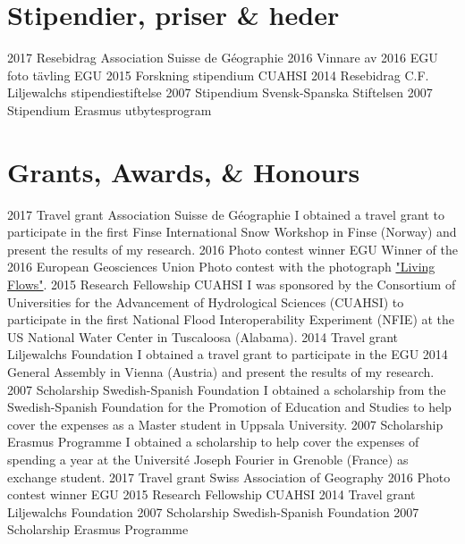 \ifswedish
    \section{Stipendier, priser \& heder}
    \shortposition
        {2017}
        {Resebidrag}
        {Association Suisse de Géographie}
    \shortposition
        {2016}
        {Vinnare av 2016 EGU foto tävling}
        {EGU}
    \shortposition
        {2015}
        {Forskning stipendium}
        {CUAHSI}
    \shortposition
        {2014}
        {Resebidrag}
        {C.F. Liljewalchs stipendiestiftelse}
    \shortposition
        {2007}
        {Stipendium}
        {Svensk-Spanska Stiftelsen}
    \shortposition
        {2007}
        {Stipendium}
        {Erasmus utbytesprogram}
\else
    \section{Grants, Awards, \& Honours}
    \ifacademic
    \position
        {2017}
        {Travel grant}
        {Association Suisse de Géographie}
        {I obtained a travel grant to participate in the first Finse International Snow Workshop in Finse (Norway) and present the results of my research.}
    \position
        {2016}
        {Photo contest winner}
        {EGU}
        {Winner of the 2016 European Geosciences Union Photo contest with the photograph \href{https://blogs.egu.eu/geolog/2016/08/29/imaggeo-on-mondays-living-flows/}{"Living Flows"}.}
    \position
        {2015}
        {Research Fellowship}
        {CUAHSI}
        {I was sponsored by the Consortium of Universities for the Advancement of Hydrological Sciences (CUAHSI) to participate in the first National Flood Interoperability Experiment (NFIE) at the US National Water Center in Tuscaloosa (Alabama).}
    \position
        {2014}
        {Travel grant}
        {Liljewalchs Foundation}
        {I obtained a travel grant to participate in the EGU 2014 General Assembly in Vienna (Austria) and present the results of my research.}
    \position
        {2007}
        {Scholarship}
        {Swedish-Spanish Foundation}
        {I obtained a scholarship from the Swedish-Spanish Foundation for the Promotion of Education and Studies to help cover the expenses as a Master student in Uppsala University.}
    \position
        {2007}
        {Scholarship}
        {Erasmus Programme}
        {I obtained a scholarship to help cover the expenses of spending a year at the Université Joseph Fourier in Grenoble (France) as exchange student.}
    \else
    \shortposition
        {2017}
        {Travel grant}
        {Swiss Association of Geography}
    \shortposition
        {2016}
        {Photo contest winner}
        {EGU}
    \shortposition
        {2015}
        {Research Fellowship}
        {CUAHSI}
    \shortposition
        {2014}
        {Travel grant}
        {Liljewalchs Foundation}
    \shortposition
        {2007}
        {Scholarship}
        {Swedish-Spanish Foundation}
    \shortposition
        {2007}
        {Scholarship}
        {Erasmus Programme}
    \fi
\fi
